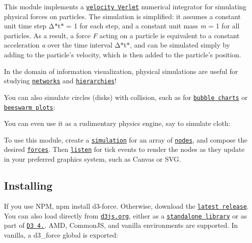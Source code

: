 This module implements a \href{https://en.wikipedia.org/wiki/Verlet_integration}{\tt velocity Verlet} numerical integrator for simulating physical forces on particles. The simulation is simplified\+: it assumes a constant unit time step Δ$\ast$t$\ast$ = 1 for each step, and a constant unit mass {\itshape m} = 1 for all particles. As a result, a force {\itshape F} acting on a particle is equivalent to a constant acceleration {\itshape a} over the time interval Δ$\ast$t$\ast$, and can be simulated simply by adding to the particle’s velocity, which is then added to the particle’s position.

In the domain of information visualization, physical simulations are useful for studying \href{http://bl.ocks.org/mbostock/ad70335eeef6d167bc36fd3c04378048}{\tt networks} and \href{http://bl.ocks.org/mbostock/95aa92e2f4e8345aaa55a4a94d41ce37}{\tt hierarchies}!

\href{http://bl.ocks.org/mbostock/ad70335eeef6d167bc36fd3c04378048}{\tt }\href{http://bl.ocks.org/mbostock/95aa92e2f4e8345aaa55a4a94d41ce37}{\tt }

You can also simulate circles (disks) with collision, such as for \href{http://www.nytimes.com/interactive/2012/09/06/us/politics/convention-word-counts.html}{\tt bubble charts} or \href{http://bl.ocks.org/mbostock/6526445e2b44303eebf21da3b6627320}{\tt beeswarm plots}\+:

\href{http://bl.ocks.org/mbostock/31ce330646fa8bcb7289ff3b97aab3f5}{\tt }\href{http://bl.ocks.org/mbostock/6526445e2b44303eebf21da3b6627320}{\tt }

You can even use it as a rudimentary physics engine, say to simulate cloth\+:

\href{http://bl.ocks.org/mbostock/1b64ec067fcfc51e7471d944f51f1611}{\tt }

To use this module, create a \href{#simulation}{\tt simulation} for an array of \href{#simulation_nodes}{\tt nodes}, and compose the desired \href{#simulation_force}{\tt forces}. Then \href{#simulation_on}{\tt listen} for tick events to render the nodes as they update in your preferred graphics system, such as Canvas or S\+VG.

\subsection*{Installing}

If you use N\+PM, {\ttfamily npm install d3-\/force}. Otherwise, download the \href{https://github.com/d3/d3-force/releases/latest}{\tt latest release}. You can also load directly from \href{https://d3js.org}{\tt d3js.\+org}, either as a \href{https://d3js.org/d3-force.v1.min.js}{\tt standalone library} or as part of \href{https://github.com/d3/d3}{\tt D3 4.}. A\+MD, Common\+JS, and vanilla environments are supported. In vanilla, a {\ttfamily d3\+\_\+force} global is exported\+:


